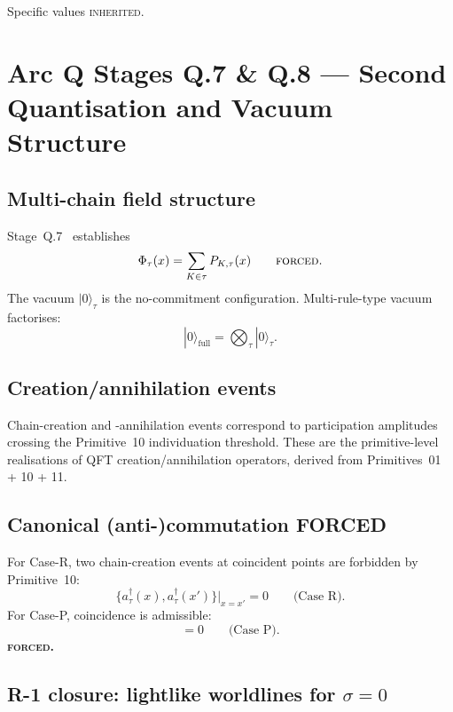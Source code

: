 \documentclass[11pt,a4paper]{article}
\begin{document}
Specific values \textsc{inherited}.

\section{Arc Q Stages Q.7 \& Q.8 --- Second Quantisation and Vacuum Structure}

\subsection{Multi-chain field structure}

Stage~Q.7~\cite{q7q2} establishes
\begin{equation}
\Phi_\tau(x) = \sum_{K \in \tau} P_{K,\tau}(x) \qquad \text{\textsc{forced}}.
\end{equation}
The vacuum $|0\rangle_\tau$ is the no-commitment configuration. Multi-rule-type vacuum factorises:
\begin{equation}
|0\rangle_\mathrm{full} = \bigotimes_\tau |0\rangle_\tau.
\end{equation}

\subsection{Creation/annihilation events}

Chain-creation and -annihilation events correspond to participation amplitudes crossing the Primitive~10 individuation threshold. These are the primitive-level realisations of QFT creation/annihilation operators, derived from Primitives~01 + 10 + 11.

\subsection{Canonical (anti-)commutation FORCED}

For Case-R, two chain-creation events at coincident points are forbidden by Primitive~10:
\begin{equation}
\{a^\dagger_\tau(x), a^\dagger_\tau(x')\}\big|_{x = x'} = 0 \qquad \text{(Case~R)}.
\end{equation}
For Case-P, coincidence is admissible:
\begin{equation}
[a^\dagger_\tau(x), a^\dagger_\tau(x')] = 0 \qquad \text{(Case~P)}.
\end{equation}
\textbf{\textsc{forced}.}

\subsection{R-1 closure: lightlike worldlines for $\sigma = 0$}
\end{document}
